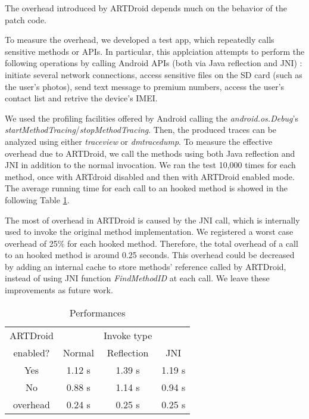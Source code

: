 The overhead introduced by ARTDroid depends much on the behavior of the patch code. 

To measure the overhead, we developed a test app, which repeatedly calls sensitive methods or APIs. In particular, this applciation attempts to perform the following operations by calling Android APIs (both via Java reflection and JNI) : initiate several network connections, access sensitive files on the SD card (such as the user's photos), send text message to premium numbers, access the user's contact list and retrive the device's IMEI. 

We used the profiling facilities offered by Android calling the \textit{android.os.Debug}'s \textit{startMethodTracing}/\textit{stopMethodTracing}. Then, the produced traces can be analyzed using either \textit{traceview} or \textit{dmtracedump}. To measure the effective overhead due to ARTDroid, we call the methods using both Java reflection and JNI in addition to the normal invocation. We ran the test 10,000 times for each method, once with ARTdroid disabled and then with ARTDroid enabled mode. The average running time for each call to an hooked method is showed in the following Table \ref{t:perf}.

The most of overhead in ARTDroid is caused by the JNI call, which is internally used to invoke the original method implementation. We registered a worst case overhead of 25\% for each hooked method. Therefore, the total overhead of a call to an hooked method is around 0.25 seconds. This overhead could be decreased by adding an internal cache to store methods' reference called by ARTDroid, instead of using JNI function \textit{FindMethodID}  at each call. We leave these improvements as future work. \\

\begin{table}[ht]
\centering
\caption{Performances}

\bigskip

\begin{tabular}{c  c c c }
\toprule
\multicolumn{1}{c}{ARTDroid} & & Invoke type \\
\cmidrule(r){2-4}
enabled? &  Normal & Reflection & JNI \\ 
\midrule
Yes & 1.12 s   &   1.39 s  &   1.19 s  \\ 
No & 0.88 s& 1.14  s & 0.94 s \\ 
\toprule
overhead & 0.24 s    &   0.25 s  &   0.25 s \\
\toprule
\end{tabular}
\label{t:perf}
\end{table}


